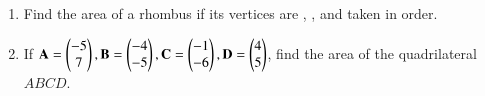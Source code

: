 \renewcommand{\theequation}{\theenumi}
\begin{enumerate}[label=\arabic*.,ref=\thesubsection.\theenumi]


\item Find the area of a rhombus if its vertices are , ,  and  taken in order.
\item If $\mathbf{A} = \begin{pmatrix}-5\\7\end{pmatrix}, \mathbf{B} = \begin{pmatrix}-4\\-5\end{pmatrix}, \mathbf{C} = \begin{pmatrix}-1\\-6\end{pmatrix}, \mathbf{D} = \begin{pmatrix}4\\5\end{pmatrix}$, find the area of the quadrilateral $ABCD$.


\end{enumerate}
